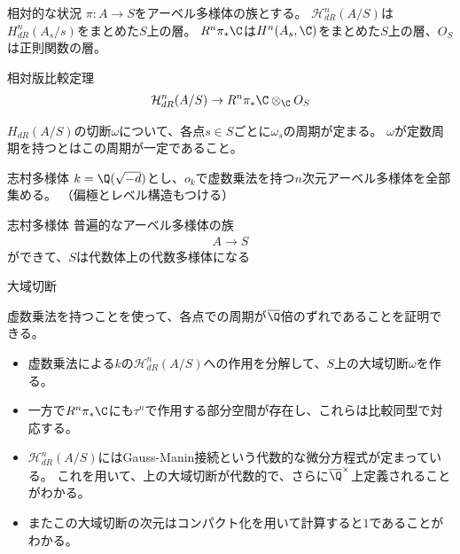 \documentclass[dvipdfmx,aspectratio=169]{beamer}
\begin{document}
\begin{frame}{相対的な状況}
$\pi:A\to S$をアーベル多様体の族とする。
$\mathcal{H}^n_{dR}(A/S)$は$H^n_{dR}(A_s/s)$をまとめた$S$上の層。
$R^n\pi_*\C$は$H^n(A_s,\C)$をまとめた$S$上の層、$O_S$は正則関数の層。

\begin{block}{相対版比較定理}
\begin{align*}
\mathcal{H}^n_{dR}(A/S) \to R^n\pi_*\C \otimes_{\C}O_S
\end{align*}
\end{block}

$H_{dR}(A/S)$の切断$\omega$について、各点$s \in S$ごとに$\omega_s$の周期が定まる。
$\omega$が定数周期を持つとはこの周期が一定であること。
\end{frame}

\begin{frame}{志村多様体}
$k=\Q(\sqrt{-d})$とし、$o_k$で虚数乗法を持つ$n$次元アーベル多様体を全部集める。
（偏極とレベル構造もつける）

\begin{block}{志村多様体}
普遍的なアーベル多様体の族
\begin{align*}
A \to S
\end{align*}
ができて、$S$は代数体上の代数多様体になる
\end{block}
\end{frame}

\begin{frame}{大域切断}


虚数乗法を持つことを使って、各点での周期が$\overline{\Q}$倍のずれであることを証明できる。

\begin{itemize}
\item 虚数乗法による$k$の$\mathcal{H}^n_{dR}(A/S)$への作用を分解して、$S$上の大域切断$\omega$を作る。
\item 一方で$R^n\pi_*\C$にも$\tau^n$で作用する部分空間が存在し、これらは比較同型で対応する。
\item $\mathcal{H}^n_{dR}(A/S)$にはGauss-Manin接続という代数的な微分方程式が定まっている。
これを用いて、上の大域切断が代数的で、さらに$\overline{\Q}^\times$上定義されることがわかる。
\item またこの大域切断の次元はコンパクト化を用いて計算すると$1$であることがわかる。
\end{itemize}
\end{frame}
\end{document}
